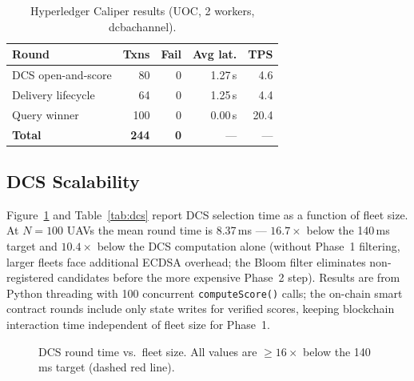 \documentclass[sigplan,screen]{acmart}
\newcommand{\uoc}{UOC\xspace}
\newcommand{\dcs}{\textsc{DCS}\xspace}
\begin{document}
\begin{table}[t]
\caption{Hyperledger Caliper results (\uoc, 2 workers, dcbachannel).}
\label{tab:caliper}
\small
\begin{tabular}{@{}lrrrr@{}}
\toprule
\textbf{Round} & \textbf{Txns} & \textbf{Fail}
  & \textbf{Avg lat.} & \textbf{TPS} \\
\midrule
DCS open-and-score  & 80  & 0 & 1.27\,s & 4.6 \\
Delivery lifecycle  & 64  & 0 & 1.25\,s & 4.4 \\
Query winner        & 100 & 0 & 0.00\,s & 20.4 \\
\midrule
\textbf{Total}      & \textbf{244} & \textbf{0} & — & — \\
\bottomrule
\end{tabular}
\end{table}

\subsection{DCS Scalability}

Figure~\ref{fig:dcs} and Table~\ref{tab:dcs} report \dcs selection time
as a function of fleet size.
At $N=100$ UAVs the mean round time is 8.37\,ms — $16.7\times$ below the
140\,ms target and $10.4\times$ below the DCS computation alone
(without Phase~1 filtering, larger fleets face additional ECDSA overhead;
the Bloom filter eliminates non-registered candidates before the more
expensive Phase~2 step).
Results are from Python threading with 100 concurrent \texttt{computeScore()}
calls; the on-chain smart contract
rounds include only state writes for verified scores, keeping blockchain
interaction time independent of fleet size for Phase~1.

\begin{figure}[t]
\centering
{}
\caption{DCS round time vs.\ fleet size. All values are $\geq16\times$ below
  the 140\,ms target (dashed red line).}
\label{fig:dcs}
\end{figure}
\end{document}
